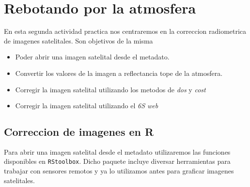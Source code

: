 \documentclass[a4paper]{article}
\begin{document}
\section{Rebotando por la atmosfera}
\label{sec:corr}
En esta segunda actividad practica nos centraremos en la correccion radiometrica
de imagenes satelitales. Son objetivos de la misma

\begin{itemize}
    \item Poder abrir una imagen satelital desde el metadato.
    \item Convertir los valores de la imagen a reflectancia tope de la
        atmosfera.
    \item Corregir la imagen satelital utilizando los metodos de \emph{dos} y
        \emph{cost}
    \item Corregir la imagen satelital utilizando el \emph{6S web}
\end{itemize}

\subsection{Correccion de imagenes en R}
\label{sub:corr:r}
Para abrir una imagen satelital desde el metadato utilizaremos las funciones
disponibles en \texttt{RStoolbox}. Dicho paquete incluye diversar herramientas
para trabajar con sensores remotos y ya lo utilizamos antes para graficar
imagenes satelitales.
\end{document}
